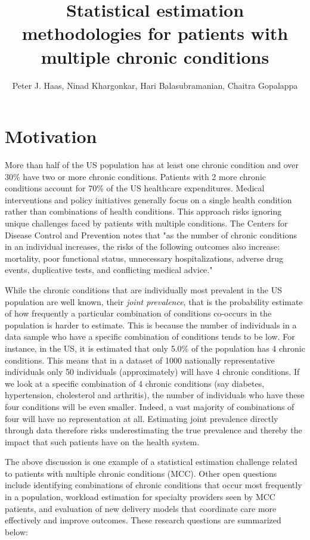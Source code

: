 \documentclass[11pt]{article}
\title{Statistical estimation methodologies for patients with multiple chronic conditions}
\author{Peter J. Haas, Ninad Khargonkar, Hari Balasubramanian, Chaitra Gopalappa}
\begin{document}
\maketitle


\section {Motivation}

More than half of the US population has at least one chronic condition and over 30\% have two or more chronic conditions. Patients with 2 more chronic conditions account for 70\% of the US healthcare expenditures. Medical interventions and policy initiatives generally focus on a single health condition rather than combinations of health conditions. This approach risks ignoring unique challenges faced by patients with multiple conditions. The Centers for Disease Control and Prevention notes that "as the number of chronic conditions in an individual increases, the risks of the following outcomes also increase: mortality, poor functional status, unnecessary hospitalizations, adverse drug events, duplicative tests, and conflicting medical advice." 

While the chronic conditions that are individually most prevalent in the US population are well known, their \emph {joint prevalence}, that is the probability estimate of how frequently a particular combination of conditions co-occurs in the population is harder to estimate. This is because the number of individuals in a data sample who have a specific combination of conditions tends to be low. For instance, in the US, it is estimated that  only 5.0\% of the population has 4 chronic conditions. This means that in a dataset of 1000 nationally representative individuals only 50 individuals (approximately) will have 4 chronic conditions. If we look at a specific combination of 4 chronic conditions (say diabetes, hypertension, cholesterol and arthritis), the number of individuals who have these four conditions will be even smaller. Indeed, a vast majority of combinations of four will have no representation at all. Estimating joint prevalence directly through data therefore risks underestimating the true prevalence and thereby the impact that such patients have on the health system.      

The above discussion is one example of a statistical estimation challenge related to patients with multiple chronic conditions (MCC). Other open questions include identifying combinations of chronic conditions that occur most frequently in a population, workload estimation for specialty providers seen by MCC patients, and evaluation of new delivery models that coordinate care more effectively and improve outcomes. These research questions are summarized below:   
\end{document}
